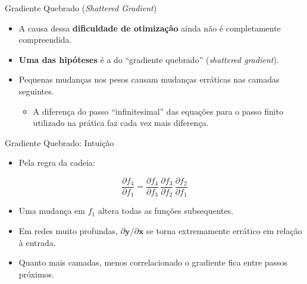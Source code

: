 \documentclass[aspectratio=169,xcolor=dvipsnames]{beamer}
\begin{document}
\begin{frame}{Gradiente Quebrado (\textit{Shattered Gradient})}
\begin{itemize}
    \item A causa dessa \textbf{dificuldade de otimização} ainda não é completamente compreendida.
    \item \textbf{Uma das hipóteses} é a do ``gradiente quebrado'' (\textit{shattered gradient}).
    \item Pequenas mudanças nos pesos causam mudanças erráticas nas camadas seguintes.
    \begin{itemize}
        \item A diferença do passo ``infinitesimal'' das equações para o passo finito utilizado na prática faz cada vez mais diferença.
    \end{itemize}
\end{itemize}
\end{frame}

\begin{frame}{Gradiente Quebrado: Intuição}
\begin{itemize}
    \item Pela regra da cadeia:
\end{itemize}
\begin{equation*}
    \frac{\partial f_4}{\partial f_1} = \frac{\partial f_4}{\partial f_3}\,\frac{\partial f_3}{\partial f_2}\,\frac{\partial f_2}{\partial f_1}
\end{equation*}
\begin{itemize}
    \item Uma mudança em $f_1$ altera todas as funções subsequentes.
    \item Em redes muito profundas, $\partial \mathbf{y} / \partial \mathbf{x}$ se torna extremamente errático em relação à entrada.
    \item Quanto mais camadas, menos correlacionado o gradiente fica entre passos próximos.
\end{itemize}
\end{frame}
\end{document}

